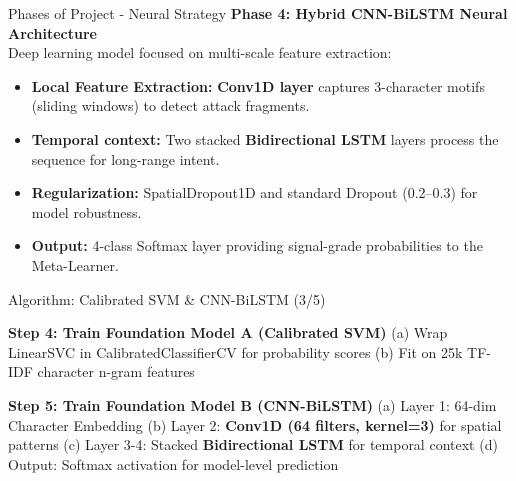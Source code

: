 \documentclass[aspectratio=169,xcolor=dvipsnames]{beamer}
\begin{document}
\begin{frame}{Phases of Project - Neural Strategy}
\textbf{Phase 4: Hybrid CNN-BiLSTM Neural Architecture} \\[0.2cm]
Deep learning model focused on multi-scale feature extraction:
\begin{itemize}
    \item \textbf{Local Feature Extraction:} \textbf{Conv1D layer} captures 3-character motifs (sliding windows) to detect attack fragments.
    \item \textbf{Temporal context:} Two stacked \textbf{Bidirectional LSTM} layers process the sequence for long-range intent.
    \item \textbf{Regularization:} SpatialDropout1D and standard Dropout (0.2--0.3) for model robustness.
    \item \textbf{Output:} 4-class Softmax layer providing signal-grade probabilities to the Meta-Learner.
\end{itemize}
\end{frame}

\begin{frame}{Algorithm: Calibrated SVM \& CNN-BiLSTM (3/5)}
\begin{algorithm}[H]
\small
\begin{algorithmic}

  \State \textbf{Step 4: Train Foundation Model A (Calibrated SVM)}
  \State \hspace{1.2em}(a) Wrap LinearSVC in CalibratedClassifierCV for probability scores
  \State \hspace{1.2em}(b) Fit on 25k TF-IDF character n-gram features

  \State \textbf{Step 5: Train Foundation Model B (CNN-BiLSTM)}
  \State \hspace{1.2em}(a) Layer 1: 64-dim Character Embedding
  \State \hspace{1.2em}(b) Layer 2: \textbf{Conv1D (64 filters, kernel=3)} for spatial patterns
  \State \hspace{1.2em}(c) Layer 3-4: Stacked \textbf{Bidirectional LSTM} for temporal context
  \State \hspace{1.2em}(d) Output: Softmax activation for model-level prediction

\end{algorithmic}
\end{algorithm}
\end{frame}
\end{document}
